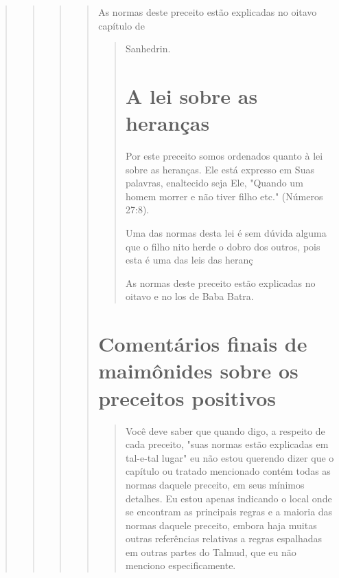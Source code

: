 \begin{quote}
\begin{quote}
\begin{quote}
\begin{quote}
As normas deste preceito estão explicadas no oitavo capítulo de

\begin{quote}
Sanhedrin.

\section{A lei sobre as heranças}

Por este preceito somos ordenados quanto à lei sobre as heranças. Ele
está expresso em Suas palavras, enaltecido seja Ele, "Quando um homem
morrer e não tiver filho etc." (Números 27:8).

Uma das normas desta lei é sem dúvida alguma que o filho nito herde o
dobro dos outros, pois esta é uma das leis das heranç

As normas deste preceito estão explicadas no oitavo e no los de Baba
Batra.
\end{quote}

\section{Comentários finais de maimônides sobre os preceitos positivos}

\begin{quote}
Você deve saber que quando digo, a respeito de cada preceito, "suas
normas estão explicadas em tal-e-tal lugar" eu não estou querendo dizer
que o capítulo ou tratado mencionado contém todas as normas daquele
preceito, em seus mínimos detalhes. Eu estou apenas indicando o local
onde se encon­tram as principais regras e a maioria das normas daquele
preceito, embora haja muitas outras referências relativas a regras
espalhadas em outras partes do Tal­mud, que eu não menciono
especificamente.


\end{quote}
\end{quote}
\end{quote}
\end{quote}
\end{quote}
